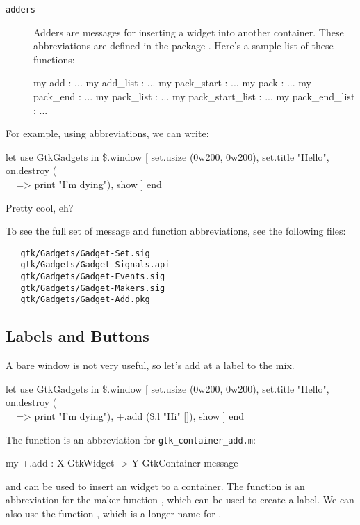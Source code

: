 \documentclass{article}
\begin{document}
\begin{description}
 \item[\tt adders]
  Adders are messages for inserting a widget into another container.
These abbreviations are defined in the package \Sml{+}.  Here's
a sample list of these functions:
\begin{smldisp}
   my add  : ...
   my add_list  : ...
   my pack_start : ...
   my pack : ...
   my pack_end  : ...
   my pack_list : ...
   my pack_start_list : ...
   my pack_end_list  : ...
\end{smldisp}
\end{description}

For example, using abbreviations, we can write:
\begin{smldisp}
   let use GtkGadgets
   in  \$.window
        [ set.usize (0w200, 0w200),
          set.title "Hello",
          on.destroy (\\ _ => print "I'm dying"),
          show
        ] 
   end
\end{smldisp}

Pretty cool, eh?

To see the full set of message and function abbreviations, see the 
following files:
\begin{verbatim}
   gtk/Gadgets/Gadget-Set.sig
   gtk/Gadgets/Gadget-Signals.api
   gtk/Gadgets/Gadget-Events.sig
   gtk/Gadgets/Gadget-Makers.sig
   gtk/Gadgets/Gadget-Add.pkg
\end{verbatim}

\subsection{Labels and Buttons}
A bare window is not very useful, so let's add at a label to the mix.

\begin{smldisp}
   let use GtkGadgets
   in  \$.window
        [ set.usize (0w200, 0w200),
          set.title "Hello",
          on.destroy (\\ _ => print "I'm dying"),
          +.add (\$.l "Hi" []),
          show
        ] 
   end
\end{smldisp}

The function  is an abbreviation for \verb|gtk_container_add.m|:
\begin{smldisp}
   my +.add : X GtkWidget -> Y GtkContainer message
\end{smldisp}
\noindent and can be used to insert an widget to a container.
The function  is an abbreviation for the maker function
, which can be used to create a label.  We can also
use the function , which is a longer name for .
\end{document}
